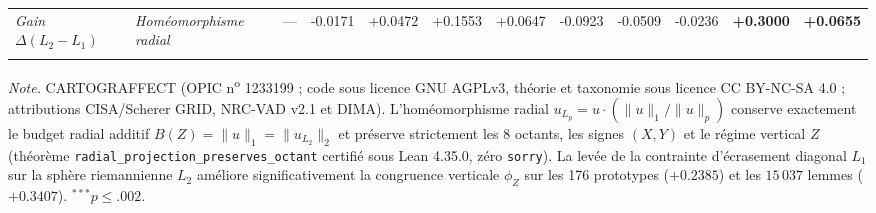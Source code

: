 \begin{table}[htbp]
\begin{threeparttable}
\begin{tabular}{l l r ccc cc cccc}
\textit{Gain $\Delta(L_2 - L_1)$} & \textit{Homéomorphisme radial} & --- & -0.0171 & +0.0472 & +0.1553 & +0.0647 & -0.0923 & -0.0509 & -0.0236 & \textbf{+0.3000} & \textbf{+0.0655} \\
\addlinespace[3pt]
\bottomrule
\end{tabular}
\begin{tablenotes}
\footnotesize
\textit{Note.} CARTOGRAFFECT\textsuperscript{\textregistered} (OPIC n\textsuperscript{o} 1233199 ; code sous licence GNU AGPLv3, théorie et taxonomie sous licence CC BY-NC-SA 4.0 ; attributions CISA/Scherer GRID, NRC-VAD v2.1 et DIMA). L'homéomorphisme radial $u_{L_p} = u \cdot (\|u\|_1 / \|u\|_p)$ conserve exactement le budget radial additif $B(Z) = \|u\|_1 = \|u_{L_2}\|_2$ et préserve strictement les 8 octants, les signes $(X, Y)$ et le régime vertical $Z$ (théorème \texttt{radial\_projection\_preserves\_octant} certifié sous Lean 4.35.0, zéro \texttt{sorry}). La levée de la contrainte d'écrasement diagonal $L_1$ sur la sphère riemannienne $L_2$ améliore significativement la congruence verticale $\phi_Z$ sur les 176 prototypes ($+0.2385$) et les $15\,037$ lemmes ($+0.3407$). $^{***}p \le .002$.
\end{tablenotes}
\end{threeparttable}
\end{table}

